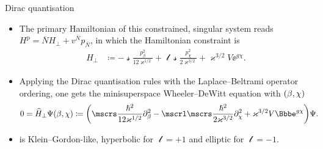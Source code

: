 \documentclass[8pt]{beamer}
\begin{document}
\begin{frame}%
{Dirac quantisation}%
\begin{itemize}
\item
The primary Hamiltonian of this constrained, singular
system reads
$H^\text{p} = \overline{N}H_\perp + v^{\overline{N}} p_{\overline{N}}$,
in which the Hamiltonian constraint is
\begin{align}
H_\perp &\coloneqq -\mscrs\frac{p_\beta^2}{12\varkappa^{1/2}}
+\mscrl\mscrs\frac{p_\chi^2}{2\varkappa^{3/2}}
+\varkappa^{3/2}V\ee^{g\chi}.
\end{align}
\item
Applying the Dirac quantisation rules with the Laplace--Beltrami
operator ordering, one 
gets the minisuperspace Wheeler--DeWitt equation with ${\left(\beta,\chi\right)}$
\begin{align}
0 &= \widehat{H}_\perp \rfun{\Psi}{\beta,\chi} \coloneqq
\rbr{\mscrs\frac{\hslash^2}{12\varkappa^{1/2}}\partial_{\beta}^2
-\mscrl\mscrs\frac{\hslash^2}{2\varkappa^{3/2}}\partial_{\chi}^2
+\varkappa^{3/2}V\ee^{g \chi}}\Psi.
\label{eq:WDW-10}
\end{align}
\item
{} is Klein--Gordon-like, hyperbolic for $\mscrl = +1$ and 
\alert{elliptic} for $\mscrl = -1$.
\end{itemize}
\end{frame}
\end{document}
